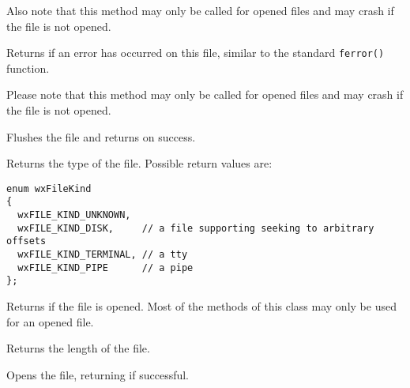Also note that this method may only be called for opened files and may crash if
the file is not opened.




\label{wxffileerror}

Returns \true if an error has occurred on this file, similar to the standard
\texttt{ferror()} function.

Please note that this method may only be called for opened files and may crash
if the file is not opened.




\label{wxffileflush}


Flushes the file and returns \true on success.


\label{wxffilegetfilekind}


Returns the type of the file. Possible return values are:

\begin{verbatim}
enum wxFileKind
{
  wxFILE_KIND_UNKNOWN,
  wxFILE_KIND_DISK,     // a file supporting seeking to arbitrary offsets
  wxFILE_KIND_TERMINAL, // a tty
  wxFILE_KIND_PIPE      // a pipe
};

\end{verbatim}


\label{wxffileisopened}


Returns \true if the file is opened. Most of the methods of this class may only
be used for an opened file.


\label{wxffilelength}


Returns the length of the file.


\label{wxffileopen}


Opens the file, returning \true if successful.


